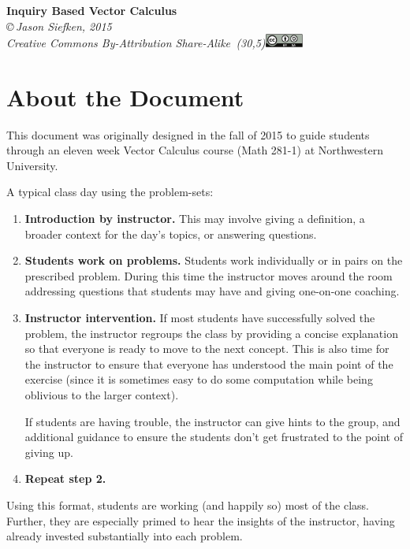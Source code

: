 \documentclass{problemset}
\begin{document}
\pagestyle{empty}

\begin{center}
{\huge\bf Inquiry Based Vector Calculus}\\

\vspace{.7in}
{
\it \copyright\,Jason Siefken, 2015 \\
Creative Commons By-Attribution Share-Alike\, \makebox(30,5){\includegraphics[height=1.2em]{by-sa.pdf}}
}
\end{center}

\section*{About the Document}

	This document was originally designed in the fall of 2015 to guide students
	through an eleven week Vector Calculus course (Math 281-1) at
	Northwestern University.  

	A typical class day using the problem-sets:
	\begin{enumerate}
		\item {\bf Introduction by instructor.} This may involve giving a definition,
			a broader context for the day's topics, or answering questions.
		\item {\bf Students work on problems.} Students work individually or in pairs
			on the prescribed problem.  During this time the instructor moves around
			the room addressing questions that students may have and giving one-on-one
			coaching.
		\item {\bf Instructor intervention.} If most students have successfully solved the 
			problem, the instructor regroups the class by providing a concise 
			explanation so that everyone is ready to move to the next concept.  This
			is also time for the instructor to ensure that everyone has understood the
			main point of the exercise (since it is sometimes easy to do some computation
			while being oblivious to the larger context).

			If students are having trouble, the instructor can give hints to the group,
			and additional guidance to ensure the students don't get frustrated
			to the point of giving up.
		\item {\bf Repeat step 2.}
	\end{enumerate}

	Using this format, students are working (and happily so) most of the class.
	Further, they are especially primed to hear the insights of the instructor, 
	having already invested substantially into each problem.
\end{document}
